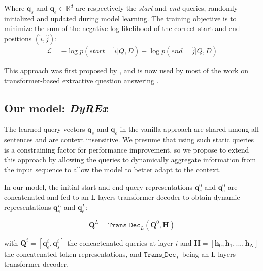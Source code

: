 \documentclass{article}
\begin{document}
Where $\textbf{q}_s$ and $\textbf{q}_e \in \mathbb{R}^d$ are respectively the \textit{start} and \textit{end} queries, randomly initialized and updated during model learning. The training objective is to minimize the sum of the negative log-likelihood of the correct start and end positions $(\hat{i}, \hat{j})$: 
\begin{align}
    \mathcal{L} = - \log p(\textit{start} = \hat{i}|Q, D) - \log p(\textit{end} = \hat{j}|Q, D)
\end{align}

This approach was first proposed by \citet{BERT}, and is now used by most of the work on transformer-based extractive question answering \citep{RoBERTa, span_BERT,shi2022revisiting}. 


\subsection{Our model: \textit{DyREx}}

The learned query vectors $\textbf{q}_s$ and $\textbf{q}_e$ in the vanilla approach are shared among all sentences and are context insensitive. We presume that using such static queries is a constraining factor for performance improvement, so we propose to extend this approach by allowing the queries to dynamically aggregate information from the input sequence to allow the model to better adapt to the context.

In our model, the initial start and end query representations $\textbf{q}_s^0$ and $\textbf{q}_e^0$ are concatenated and fed to an L-layers transformer decoder \citep{attention_is_all_u_need} to obtain dynamic representations $\textbf{q}_s^L$ and $\textbf{q}_e^L$: 

\begin{equation}
    \textbf{Q}^L = \texttt{Trans\_Dec}_{L}(\textbf{Q}^0, \textbf{H}) 
\end{equation}

with $\textbf{Q}^i = [\textbf{q}_e^i, \textbf{q}_s^i]$ the concactenated queries at layer $i$ and $\textbf{H} = [\textbf{h}_0, \textbf{h}_1, ..., \textbf{h}_N]$ the concatenated token representations, and $\texttt{Trans\_Dec}_{L}$ being an L-layers transformer decoder. 
\end{document}
